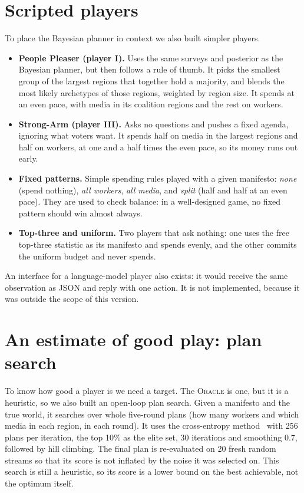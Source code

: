 \documentclass[11pt,a4paper,oneside]{report}
\newcommand{\ORACLE}{\textsc{Oracle}}
\begin{document}
\section{Scripted players}

To place the Bayesian planner in context we also built simpler players.
\begin{itemize}
  \item \textbf{People Pleaser (player I).} Uses the same surveys and posterior as the Bayesian planner,
        but then follows a rule of thumb. It picks the smallest group of the largest regions that together
        hold a majority, and blends the most likely archetypes of those regions, weighted by region size.
        It spends at an even pace, with media in its coalition regions and the rest on workers.
  \item \textbf{Strong-Arm (player III).} Asks no questions and pushes a fixed agenda, ignoring what voters
        want. It spends half on media in the largest regions and half on workers, at one and a half times
        the even pace, so its money runs out early.
  \item \textbf{Fixed patterns.} Simple spending rules played with a given manifesto: \emph{none} (spend
        nothing), \emph{all workers}, \emph{all media}, and \emph{split} (half and half at an even pace).
        They are used to check balance: in a well-designed game, no fixed pattern should win almost
        always.
  \item \textbf{Top-three and uniform.} Two players that ask nothing: one uses the free top-three statistic
        as its manifesto and spends evenly, and the other commits the uniform budget and never spends.
\end{itemize}

An interface for a language-model player also exists: it would receive the same observation as JSON and
reply with one action. It is not implemented, because it was outside the scope of this version.

\section{An estimate of good play: plan search}

To know how good a player is we need a target. The \ORACLE{} is one, but it is a heuristic, so we also
built an open-loop plan search. Given a manifesto and the true world, it searches over whole five-round
plans (how many workers and which media in each region, in each round). It uses the cross-entropy
method~\cite{rubinstein1999} with 256 plans per iteration, the top 10\% as the elite set, 30 iterations and
smoothing 0.7, followed by hill climbing. The final plan is re-evaluated on 20 fresh random streams so that
its score is not inflated by the noise it was selected on. This search is still a heuristic, so its score
is a lower bound on the best achievable, not the optimum itself.
\end{document}
